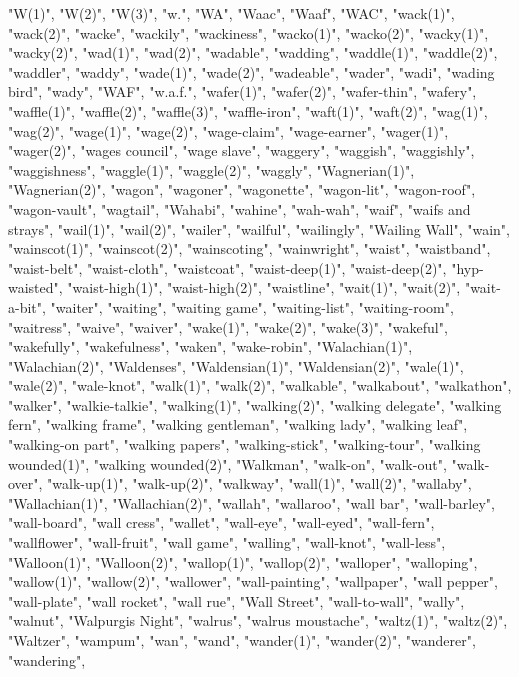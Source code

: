 "W(1)",
"W(2)",
"W(3)",
"w.",
"WA",
"Waac",
"Waaf",
"WAC",
"wack(1)",
"wack(2)",
"wacke",
"wackily",
"wackiness",
"wacko(1)",
"wacko(2)",
"wacky(1)",
"wacky(2)",
"wad(1)",
"wad(2)",
"wadable",
"wadding",
"waddle(1)",
"waddle(2)",
"waddler",
"waddy",
"wade(1)",
"wade(2)",
"wadeable",
"wader",
"wadi",
"wading bird",
"wady",
"WAF",
"w.a.f.",
"wafer(1)",
"wafer(2)",
"wafer-thin",
"wafery",
"waffle(1)",
"waffle(2)",
"waffle(3)",
"waffle-iron",
"waft(1)",
"waft(2)",
"wag(1)",
"wag(2)",
"wage(1)",
"wage(2)",
"wage-claim",
"wage-earner",
"wager(1)",
"wager(2)",
"wages council",
"wage slave",
"waggery",
"waggish",
"waggishly",
"waggishness",
"waggle(1)",
"waggle(2)",
"waggly",
"Wagnerian(1)",
"Wagnerian(2)",
"wagon",
"wagoner",
"wagonette",
"wagon-lit",
"wagon-roof",
"wagon-vault",
"wagtail",
"Wahabi",
"wahine",
"wah-wah",
"waif",
"waifs and strays",
"wail(1)",
"wail(2)",
"wailer",
"wailful",
"wailingly",
"Wailing Wall",
"wain",
"wainscot(1)",
"wainscot(2)",
"wainscoting",
"wainwright",
"waist",
"waistband",
"waist-belt",
"waist-cloth",
"waistcoat",
"waist-deep(1)",
"waist-deep(2)",
"hyp-waisted",
"waist-high(1)",
"waist-high(2)",
"waistline",
"wait(1)",
"wait(2)",
"wait-a-bit",
"waiter",
"waiting",
"waiting game",
"waiting-list",
"waiting-room",
"waitress",
"waive",
"waiver",
"wake(1)",
"wake(2)",
"wake(3)",
"wakeful",
"wakefully",
"wakefulness",
"waken",
"wake-robin",
"Walachian(1)",
"Walachian(2)",
"Waldenses",
"Waldensian(1)",
"Waldensian(2)",
"wale(1)",
"wale(2)",
"wale-knot",
"walk(1)",
"walk(2)",
"walkable",
"walkabout",
"walkathon",
"walker",
"walkie-talkie",
"walking(1)",
"walking(2)",
"walking delegate",
"walking fern",
"walking frame",
"walking gentleman",
"walking lady",
"walking leaf",
"walking-on part",
"walking papers",
"walking-stick",
"walking-tour",
"walking wounded(1)",
"walking wounded(2)",
"Walkman",
"walk-on",
"walk-out",
"walk-over",
"walk-up(1)",
"walk-up(2)",
"walkway",
"wall(1)",
"wall(2)",
"wallaby",
"Wallachian(1)",
"Wallachian(2)",
"wallah",
"wallaroo",
"wall bar",
"wall-barley",
"wall-board",
"wall cress",
"wallet",
"wall-eye",
"wall-eyed",
"wall-fern",
"wallflower",
"wall-fruit",
"wall game",
"walling",
"wall-knot",
"wall-less",
"Walloon(1)",
"Walloon(2)",
"wallop(1)",
"wallop(2)",
"walloper",
"walloping",
"wallow(1)",
"wallow(2)",
"wallower",
"wall-painting",
"wallpaper",
"wall pepper",
"wall-plate",
"wall rocket",
"wall rue",
"Wall Street",
"wall-to-wall",
"wally",
"walnut",
"Walpurgis Night",
"walrus",
"walrus moustache",
"waltz(1)",
"waltz(2)",
"Waltzer",
"wampum",
"wan",
"wand",
"wander(1)",
"wander(2)",
"wanderer",
"wandering",
